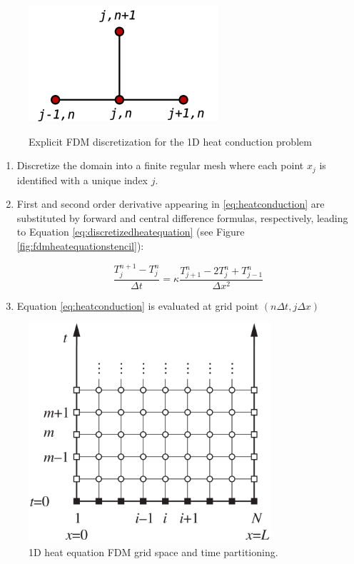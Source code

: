  \begin{figure}[b]
 	\centering
 	\includegraphics[scale=0.5]{./images/CA_FDM/heatstencil}
 	\label{fig:fdmheatequationstencil}
 	\caption{Explicit FDM discretization for the 1D heat conduction problem}\label{torus}
 \end{figure}   
 
 \begin{enumerate}
 
 \item Discretize the domain into a finite regular mesh where each point $x_j$ is identified with a unique index $j$.
    
 \item  First and second order derivative appearing in \ref{eq:heatconduction} are substituted by forward and central difference formulas, respectively, leading to Equation \ref{eq:discretizedheatequation} (see Figure  \ref{fig:fdmheatequationstencil}):
 
 \begin{equation}
  \frac{T^{n+1}_{j} - T^n_{j}}{\Delta t} = \kappa \frac{T^n_{j+1}- 2T^n_{j} + T^n_{j-1}}{\Delta x^2}
 \label{eq:discretizedheatequation}
 \end{equation}
 
 \item Equation \ref{eq:heatconduction} is evaluated at grid point $(n\Delta t, j \Delta x)$ 
    
\end{enumerate}    
    

    
\begin{figure}
\centering
\includegraphics[width=0.8\textwidth]{./images/CA_FDM/fdmgrid}
\caption{1D heat equation FDM grid space and time partitioning.}\label{torus}
\end{figure}

